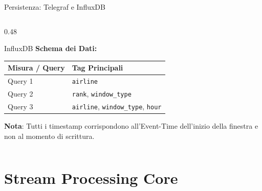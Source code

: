 \documentclass[10pt, aspectratio=169]{beamer}
\begin{document}
\begin{frame}[fragile]{Persistenza: Telegraf e InfluxDB}
\begin{columns}[t]
\begin{column}{0.48\textwidth}
\begin{block}{InfluxDB}
                \vspace{0.15cm}
                \textbf{Schema dei Dati:}
                \vskip 0.05cm
                \centering
                \renewcommand{\arraystretch}{1.2}
                \begin{tabular}{ll}
                    \hline
                    \textbf{Misura / Query} & \textbf{Tag Principali} \\ \hline
                    Query 1 & \texttt{airline} \\
                    Query 2 & \texttt{rank}, \texttt{window\_type} \\
                    Query 3 & \texttt{airline}, \texttt{window\_type}, \texttt{hour} \\ \hline
                \end{tabular}
                \vskip 0.1cm
                \flushleft
                \tiny \textbf{Nota}: Tutti i timestamp corrispondono all'Event-Time dell'inizio della finestra e non al momento di scrittura.
            \end{block}
        \end{column}
    \end{columns}
\end{frame}

\section{Stream Processing Core}\label{sec:stream_processing_core}
\end{document}
